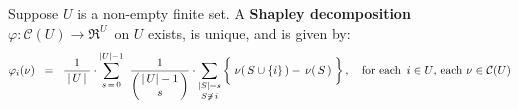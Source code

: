 \begin{theorem}
\label{theorem:ShapleyDecompositionExistenceUniqueness}
\mbox{}
\vskip 0.1cm
\noindent
Suppose $U$ is a non-empty finite set.
A \textbf{Shapley decomposition}
\,$\varphi : \mathcal{C}(U) \longrightarrow \Re^{U}$\,
on $U$ exists, is unique, and is given by:
\begin{equation*}
\varphi_{i}(\nu)
\;\; = \;\;
	\dfrac{1}{{\color{white}.}\vert\, U \,\vert{\color{white}.}}
	\cdot
	\overset{\vert U \vert-1}{\underset{s\,=\,0}{\sum}}\;\;
	\dfrac{1}{\left(\!\!\begin{array}{c} \vert\,U \vert-1 \\ s \end{array}\!\!\right)}
	\cdot
	\underset{S \not\ni\,i}{\underset{\vert S \vert = s}{\sum}}
		\left\{\;
			\nu\!\left(\,S\cup\{i\}\,\right) \overset{{\color{white}1}}{-}\, \nu\!\left(\,S\,\right)
			\;\right\},
\quad
\textnormal{for each \,$i \in U$, each $\nu \in \mathcal{C}(U)$}
\end{equation*}
\end{theorem}


\renewcommand{\theenumi}{\roman{enumi}}
\renewcommand{\labelenumi}{\textnormal{(\theenumi)}$\;\;$}

